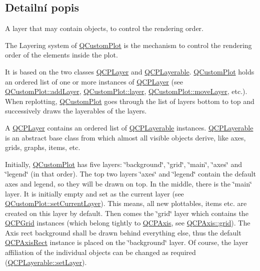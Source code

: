 \subsection{Detailní popis}
A layer that may contain objects, to control the rendering order. 

The Layering system of \hyperlink{classQCustomPlot}{Q\+Custom\+Plot} is the mechanism to control the rendering order of the elements inside the plot.

It is based on the two classes \hyperlink{classQCPLayer}{Q\+C\+P\+Layer} and \hyperlink{classQCPLayerable}{Q\+C\+P\+Layerable}. \hyperlink{classQCustomPlot}{Q\+Custom\+Plot} holds an ordered list of one or more instances of \hyperlink{classQCPLayer}{Q\+C\+P\+Layer} (see \hyperlink{classQCustomPlot_ad5255393df078448bb6ac83fa5db5f52}{Q\+Custom\+Plot\+::add\+Layer}, \hyperlink{classQCustomPlot_aac492da01782820454e9136a8db28182}{Q\+Custom\+Plot\+::layer}, \hyperlink{classQCustomPlot_ae896140beff19424e9e9e02d6e331104}{Q\+Custom\+Plot\+::move\+Layer}, etc.). When replotting, \hyperlink{classQCustomPlot}{Q\+Custom\+Plot} goes through the list of layers bottom to top and successively draws the layerables of the layers.

A \hyperlink{classQCPLayer}{Q\+C\+P\+Layer} contains an ordered list of \hyperlink{classQCPLayerable}{Q\+C\+P\+Layerable} instances. \hyperlink{classQCPLayerable}{Q\+C\+P\+Layerable} is an abstract base class from which almost all visible objects derive, like axes, grids, graphs, items, etc.

Initially, \hyperlink{classQCustomPlot}{Q\+Custom\+Plot} has five layers\+: \char`\"{}background\char`\"{}, \char`\"{}grid\char`\"{}, \char`\"{}main\char`\"{}, \char`\"{}axes\char`\"{} and \char`\"{}legend\char`\"{} (in that order). The top two layers \char`\"{}axes\char`\"{} and \char`\"{}legend\char`\"{} contain the default axes and legend, so they will be drawn on top. In the middle, there is the \char`\"{}main\char`\"{} layer. It is initially empty and set as the current layer (see \hyperlink{classQCustomPlot_a73a6dc47c653bb6f8f030abca5a11852}{Q\+Custom\+Plot\+::set\+Current\+Layer}). This means, all new plottables, items etc. are created on this layer by default. Then comes the \char`\"{}grid\char`\"{} layer which contains the \hyperlink{classQCPGrid}{Q\+C\+P\+Grid} instances (which belong tightly to \hyperlink{classQCPAxis}{Q\+C\+P\+Axis}, see \hyperlink{classQCPAxis_ac4fb913cce3072b5e75a4635e0f6cd04}{Q\+C\+P\+Axis\+::grid}). The Axis rect background shall be drawn behind everything else, thus the default \hyperlink{classQCPAxisRect}{Q\+C\+P\+Axis\+Rect} instance is placed on the \char`\"{}background\char`\"{} layer. Of course, the layer affiliation of the individual objects can be changed as required (\hyperlink{classQCPLayerable_ab0d0da6d2de45a118886d2c8e16d5a54}{Q\+C\+P\+Layerable\+::set\+Layer}).


